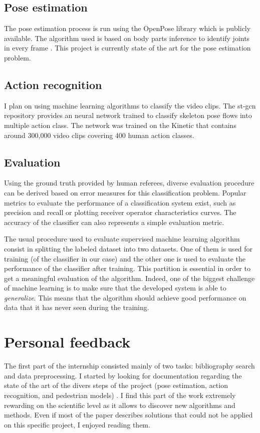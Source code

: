 \documentclass[12pt,a4paper,twoside]{article}
\begin{document}
\subsection{Pose estimation}
The pose estimation process is run using the OpenPose library which is publicly available. The algorithm used is based on body parts inference to identify joints in every frame \cite{Cao2016}. This project is currently state of the art for the pose estimation problem.

\subsection{Action recognition}
I plan on using machine learning algorithms to classify the video clips. The st-gcn repository provides an neural network trained to classify skeleton pose flows into multiple action class. The network was trained on the Kinetic 
 that contains around 300,000 video clips covering 400 human action classes.

\subsection{Evaluation}
Using the ground truth provided by human referees, diverse evaluation procedure can be derived based on error measures for this classification problem. Popular metrics to evaluate the performance of a classification system exist, such as precision and recall  or plotting receiver operator characteristics curves. The accuracy of the classifier can also represents a simple evaluation metric.

The usual procedure used to evaluate supervised machine learning algorithm consist in splitting the labeled dataset into two datasets. One of them is used for training (of the classifier in our case) and the other one is used to evaluate the performance of the classifier after training. This partition is essential in order to get a meaningful evaluation of the algorithm. Indeed, one of the biggest challenge of machine learning is to make sure that the developed system is able  to \textit{generalize}. This means that the algorithm should achieve good performance on data that it has never seen during the training.

\section{Personal feedback}
The first part of the internship consisted mainly of two tasks: bibliography search and data preprocessing. I started by looking for documentation regarding the state of the art of the divers steps of the project (pose estimation, action recognition, and pedestrian models)
. I find this part of the work extremely rewarding on the scientific level as it allows to discover new algorithms and methods. Even if most of the paper describes solutions that could not be applied on this specific project, I enjoyed reading them.
\end{document}
